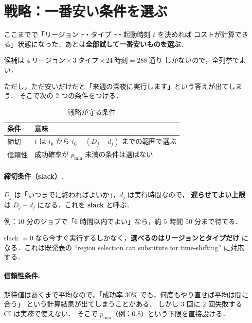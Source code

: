 \documentclass[11pt,a4paper]{ltjsarticle}
\begin{document}
\section{戦略：一番安い条件を選ぶ}

ここまでで「リージョン $r$・タイプ $\tau$・起動時刻 $t$ を決めれば
コストが計算できる」状態になった．あとは\textbf{全部試して一番安いものを選ぶ}．

候補は $4\ \text{リージョン} \times 3\ \text{タイプ} \times 24\ \text{時刻}
= 288\ \text{通り}$ しかないので，全列挙でよい．

ただし，ただ安いだけだと「来週の深夜に実行します」という答えが出てしまう．
そこで次の 2 つの条件をつける．

\begin{table}[htbp]
\centering
\caption{戦略が守る条件}
\begin{tabularx}{\textwidth}{@{}lX@{}}
\toprule
条件 & 意味 \\
\midrule
締切 & $t$ は $t_0$ から $t_0 + (D_j - d_j)$ までの範囲で選ぶ \\
\addlinespace
信頼性 & 成功確率が $p_{\min}$ 未満の条件は選ばない \\
\bottomrule
\end{tabularx}
\end{table}

\paragraph{締切条件（slack）.}
$D_j$ は「いつまでに終わればよいか」，$d_j$ は実行時間なので，
\textbf{遅らせてよい上限}は $D_j - d_j$ になる．これを \textbf{slack} と呼ぶ．

例：$10$ 分のジョブで「$6$ 時間以内でよい」なら，約 $5$ 時間 $50$ 分まで待てる．

slack $= 0$ なら今すぐ実行するしかなく，\textbf{選べるのはリージョンとタイプだけ}
になる．これは既発表の
``region selection can substitute for time-shifting'' に対応する．

\paragraph{信頼性条件.}
期待値はあくまで平均なので，「成功率 $30\%$ でも，何度もやり直せば平均は間に合う」
という計算結果が出てしまうことがある．
しかし 3 回に 2 回失敗する CI は実務で使えない．
そこで $p_{\min}$（例：$0.8$）という下限を直接設ける．
\end{document}
